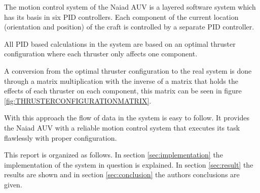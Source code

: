 The motion control system of the Naiad AUV is a layered software system which has its basis in six PID controllers. Each component of the current location (orientation and position) of the craft is controlled by a separate PID controller. 

All PID based calculations in the system are based on an optimal thruster configuration where each thruster only affects one component.

A conversion from the optimal thruster configuration to the real system is done through a matrix multiplication with the inverse of a matrix that holds the effects of each thruster on each component, this matrix can be seen in figure \ref{fig:THRUSTERCONFIGURATIONMATRIX}.

With this approach the flow of data in the system is easy to follow. It provides the Naiad AUV with a reliable motion control system that executes its task flawlessly with proper configuration.

This report is organized as follows. In section \ref{sec:implementation} the implementation of the system in question is explained. In section \ref{sec:result} the results are shown and in section \ref{sec:conclusion} the authors conclusions are given. 
